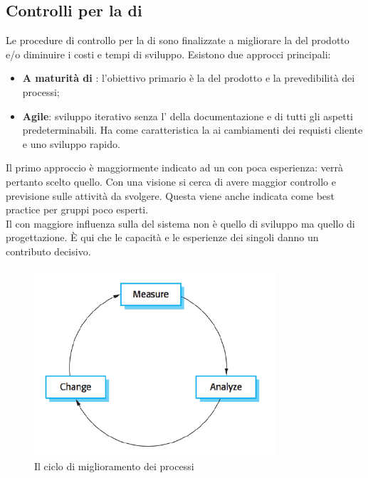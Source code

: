 \subsection{Controlli per la  di }
Le procedure di controllo per la  di  sono finalizzate a migliorare la  del prodotto e/o diminuire i costi e tempi di sviluppo. Esistono due approcci principali:
\begin{itemize}
\item \textbf{A maturità di }: l'obiettivo primario è la  del prodotto e la prevedibilità dei processi;
\item \textbf{Agile}: sviluppo iterativo senza l' della documentazione e di tutti gli aspetti predeterminabili. Ha come caratteristica la  ai cambiamenti dei requisti cliente e uno sviluppo rapido.
\end{itemize}
Il primo approccio è maggiormente indicato ad un  con poca esperienza: verrà pertanto scelto quello. Con una visione  si cerca di avere maggior controllo e previsione sulle attività da svolgere. Questa viene anche indicata come best practice per gruppi poco esperti.\\
Il  con maggiore influenza sulla  del sistema non è quello di sviluppo ma quello di progettazione. È qui che le capacità e le esperienze dei singoli danno un contributo decisivo.\\
\begin{figure}[h]
\centering \includegraphics[width=0.8\textwidth]{res/sections/processImprovement.png}
\caption{Il ciclo di miglioramento dei processi}
\end{figure}
